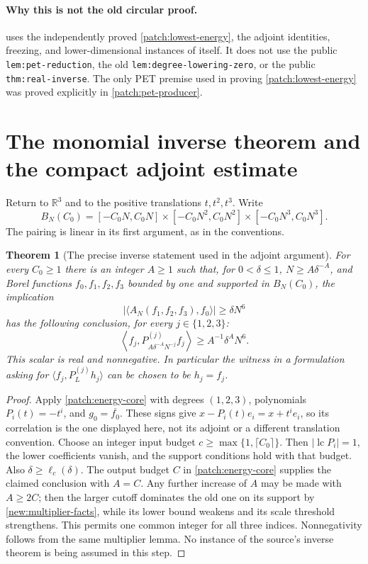 \documentclass[11pt]{article}
\newtheorem{theorem}{Theorem}[section]
\theoremstyle{definition}
\newcommand{\pid}[1]{\nolinkurl{#1}}
\newcommand{\R}{\mathbb R}
\begin{document}
\paragraph{Why this is not the old circular proof.}
 uses the independently proved \cref{patch:lowest-energy}, the
adjoint identities, freezing, and lower-dimensional instances of itself.
It does not use the public \pid{lem:pet-reduction}, the old \pid{lem:degree-lowering-zero},
or the public \pid{thm:real-inverse}.  The only PET premise used in proving
\cref{patch:lowest-energy} was proved explicitly in \cref{patch:pet-producer}.


\section{The monomial inverse theorem and the compact adjoint estimate}
\label{new:compact-section}
Return to $\R^3$ and to the positive translations $t,t^2,t^3$. Write
\[
 B_N(C_0)=[-C_0N,C_0N]\times[-C_0N^2,C_0N^2]\times[-C_0N^3,C_0N^3].
\]
The pairing is linear in its first argument, as in the conventions.

\begin{theorem}[The precise inverse statement used in the adjoint argument]\label{new:monomial-inverse}
For every $C_0\geq1$ there is an integer $A\geq1$ such that, for $0<\delta\leq1$,
$N\geq A\delta^{-A}$, and Borel functions $f_0,f_1,f_2,f_3$ bounded by one and supported
in $B_N(C_0)$, the implication
\[
 |\langle A_N(f_1,f_2,f_3),f_0\rangle|\geq\delta N^6
\]
has the following conclusion, for every $j\in\{1,2,3\}$:
\[
 \left\langle f_j,P_{A\delta^{-A}N^{-j}}^{(j)}f_j\right\rangle
 \geq A^{-1}\delta^A N^6.
\]
This scalar is real and nonnegative. In particular the witness in a formulation asking for
$\langle f_j,P_L^{(j)}h_j\rangle$ can be chosen to be $h_j=f_j$.
\end{theorem}
\begin{proof}
Apply \cref{patch:energy-core} with degrees $(1,2,3)$, polynomials $P_i(t)=-t^i$, and
$g_0=\overline{f_0}$. These signs give $x-P_i(t)e_i=x+t^ie_i$, so its correlation is the
one displayed here, not its adjoint or a different translation convention. Choose an integer
input budget $c\geq\max\{1,\lceil C_0\rceil\}$. Then $|\operatorname{lc}P_i|=1$, the lower
coefficients vanish, and the support conditions hold with that budget. Also
$\delta\geq\ell_c(\delta)$. The output budget $C$ in \cref{patch:energy-core} supplies the
claimed conclusion with $A=C$. Any further increase of $A$ may be made with $A\geq2C$;
then the larger cutoff dominates the old one on its support by
\cref{new:multiplier-facts}, while its lower bound weakens and its scale threshold strengthens.
This permits one common integer for all three indices. Nonnegativity follows from the same
multiplier lemma. No instance of the source's inverse theorem is being assumed in this step.
\end{proof}
\end{document}
